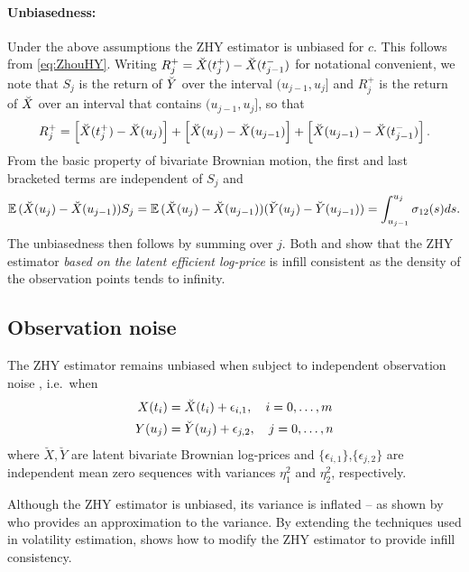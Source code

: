 \paragraph{Unbiasedness:}
Under the above assumptions the ZHY estimator is unbiased for $c$. This follows from \eqref{eq:ZhouHY}. Writing
$R^{+}_j = \breve{X}(t^+_j) - \breve{X}(t^-_{j-1})$ for notational convenient, we note that 
$S_j$ is the return of $\breve{Y}$ over the interval $(u_{j-1},u_j]$ and $R^+_j$ is the return of $\breve{X}$ over an interval that contains $(u_{j-1},u_j]$, so that 
$$R^+_j = \left[\breve{X}(t^+_j) - \breve{X}(u_{j})\right] + \left[\breve{X}(u_{j}) - \breve{X}(u_{j-1})\right] + \left[\breve{X}(u_{j-1}) -  \breve{X}(t^-_{j-1})\right].
$$
From the basic property of bivariate Brownian motion, the first and last bracketed terms are independent of $S_j$ and 
$$ \mathbb{E}\, (\breve{X}(u_{j}) - \breve{X}(u_{j-1})) S_j  = \mathbb{E}\, (\breve{X}(u_{j}) - \breve{X}(u_{j-1})) (\breve{Y}(u_{j}) - \breve{Y}(u_{j-1})) = \int_{u_{j-1}}^{u_j} \sigma_{12}(s) ds. $$ The unbiasedness then follows by summing over $j$. Both \citet{zhou1998estimating} and \citet{hayashi2005covariance} show that the ZHY estimator \emph{based on the latent efficient log-price} is infill consistent as the density of the observation points tends to infinity.

\subsection{Observation noise}

The ZHY estimator remains unbiased when subject to independent observation noise \citep{zhou1998estimating}, i.e.\ when
%
\begin{align}\label{eq:noiseAssumptions}
X(t_i) &= \breve{X}(t_i) + \epsilon_{i,1},\quad i = 0, \dots,m \notag\\
Y(u_j) &= \breve{Y}(u_j) + \epsilon_{j,2},\quad j = 0, \dots,n
\end{align}
where $\breve{X}, \breve{Y}$ are latent bivariate Brownian log-prices and $\{\epsilon_{i,1}\}$,$\{\epsilon_{j,2}\}$ are independent mean zero sequences with variances $\eta_1^2$ and $\eta_2^2$, respectively. 

Although the ZHY estimator is unbiased, its variance is inflated -- as shown by  \citet{zhou1998estimating} who provides an approximation to the variance. By extending the techniques used in volatility estimation, \citet{zhang2011estimating} shows how to modify the ZHY estimator to provide infill consistency.
